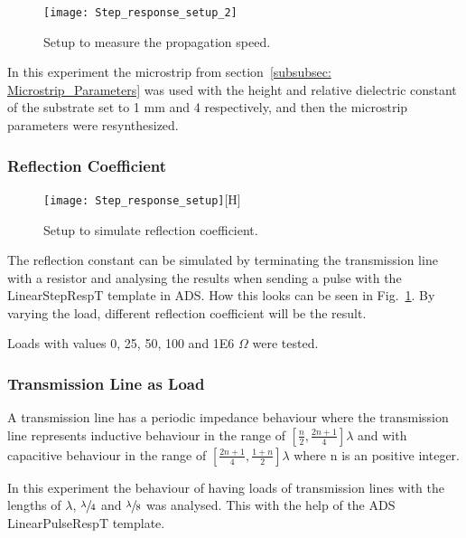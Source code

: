 \documentclass[report.tex]{subfiles}
\begin{document}
\begin{figure}[H]
	\texttt{[image: Step\_response\_setup\_2]}
	\caption{Setup to measure the propagation speed.}
\end{figure}

In this experiment the microstrip from section~\ref{subsubsec: Microstrip_Parameters} was used with the height and relative dielectric constant of the substrate set to 1 mm and 4 respectively, and then the microstrip parameters were resynthesized.

\subsubsection{Reflection Coefficient}

\begin{figure}[h]
	\texttt{[image: Step\_response\_setup]}[H]
	\caption{Setup to simulate reflection coefficient.}\label{fig:Lab1 reflection coefficient}
\end{figure}

The reflection constant can be simulated by terminating the transmission line with a resistor and analysing the results when sending a pulse with the LinearStepRespT template in ADS. How this looks can be seen in Fig.~\ref{fig:Lab1 reflection coefficient}. By varying the load, different reflection coefficient will be the result.

Loads with values 0, 25, 50, 100 and 1E6 $\Omega$ were tested.

\subsubsection{Transmission Line as Load}
A transmission line has a periodic impedance behaviour where the transmission line represents inductive behaviour in the range of $\left[ \frac{n}{2},\frac{2n + 1}{4} \right]\lambda$ and with capacitive behaviour in the range of $\left[\frac{2n + 1}{4},\frac{1 + n}{2} \right]\lambda$ where n is an positive integer.

In this experiment the behaviour of having loads of transmission lines with the lengths of $\lambda$, $\sfrac{\lambda}{4}$ and $\sfrac{\lambda}{8}$ was analysed. This with the help of the ADS LinearPulseRespT template.
\end{document}
